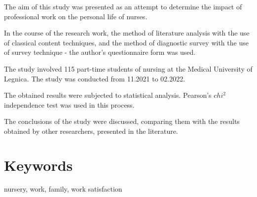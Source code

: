 \documentclass[a4paper,12pt,twoside,openright]{mwrep}
\begin{document}
The aim of this study was presented as an attempt to determine the impact of professional work on the personal life of nurses.


In the course of the research work, the method of literature analysis with the use of classical content techniques, and the method of diagnostic survey with the use of survey technique - the author's questionnaire form was used. 

The study involved 115 part-time students of nursing at the Medical University of Legnica. The study was conducted from 11.2021 to 02.2022.

The obtained results were subjected to statistical analysis. Pearson's $chi^2$ independence test was used in this process.

The conclusions of the study were discussed, comparing them with the results obtained by other researchers, presented in the literature.
\vspace{\baselineskip} 

\section*{Keywords}

\vspace{\baselineskip} 

nursery, work, family, work satisfaction


%
%




\makeatletter 
\renewcommand\@biblabel[1]{#1.~} 
\makeatother
\end{document}
